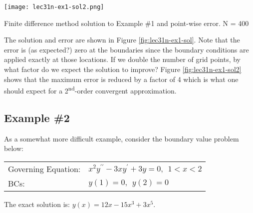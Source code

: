 \begin{marginfigure}[-2.0cm]
\texttt{[image: lec31n-ex1-sol2.png]}
\caption{Finite difference method solution to Example \#1 and point-wise error. N = 400}
\label{fig:lec31n-ex1-sol2}
\end{marginfigure}
The solution and error are shown in Figure \ref{fig:lec31n-ex1-sol}. Note that the error is (as expected?) zero at the boundaries since the boundary conditions are applied exactly at those locations.  If we double the number of grid points, by what factor do we expect the solution to improve?  Figure \ref{fig:lec31n-ex1-sol2} shows that the maximum error is reduced by a factor of 4 which is what one should expect for a 2\textsuperscript{nd}-order convergent approximation.   


\subsection{Example \#2}
As a somewhat more difficult example, consider the boundary value problem below:

\begin{table}
\begin{tabular}{l l}
Governing Equation: & $x^2y^{\prime \prime} - 3xy^{\prime} + 3y = 0, \ \ 1 < x < 2$ \\
BCs: & $y(1) = 0, \ \ y(2) = 0$ \\
\end{tabular}
\end{table}

\vspace{0.25cm}

\noindent The exact solution is: $y(x) = 12x-15x^3 + 3x^5$.

